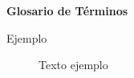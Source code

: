 \begin{center}
    {\fontsize{20}{80}\selectfont \textbf{Glosario de Términos}\\}
\end{center}
\bigskip

\begin{description}
    \item[Ejemplo] Texto ejemplo 
\end{description}